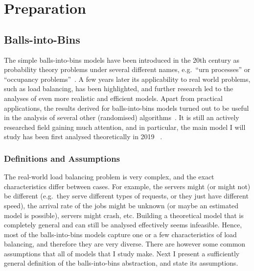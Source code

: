 \chapter{Preparation}\label{preparation}

\ifpdf
    \graphicspath{{Chapter2/Figs/Raster/}{Chapter2/Figs/PDF/}{Chapter2/Figs/}}
\else
    \graphicspath{{Chapter2/Figs/Vector/}{Chapter2/Figs/}}
\fi



\section{Balls-into-Bins}


The simple balls-into-bins models have been introduced in the 20th century as probability theory problems under several different names, e.g.\ ``urn processes'' or ``occupancy problems''~\cite{kolchin1978coined}. A few years later its applicability to real world problems, such as load balancing, has been highlighted, and further research led to the analyses of even more realistic and efficient models. Apart from practical applications, the results derived for balls-into-bins models turned out to be useful in the analysis of several other (randomised) algorithms~\cite{edmonds2006cakecutting}. It is still an actively researched field gaining much attention, and in particular, the main model I will study has been first analysed theoretically in 2019~\cite{dwivedi2019firstthinning} .


\subsection{Definitions and Assumptions} \label{definitions}



The real-world load balancing problem is very complex, and the exact characteristics differ between cases. For example, the servers might (or might not) be different (e.g.\ they serve different types of requests, or they just have different speed), the arrival rate of the jobs might be unknown (or maybe an estimated model is possible), servers might crash, etc. Building a theoretical model that is completely general and can still be analysed effectively seems infeasible. Hence, most of the balls-into-bins models capture one or a few characteristics of load balancing, and therefore they are very diverse. There are however some common assumptions that all of models that I study make. Next I present a sufficiently general definition of the balls-into-bins abstraction, and state its assumptions. 


